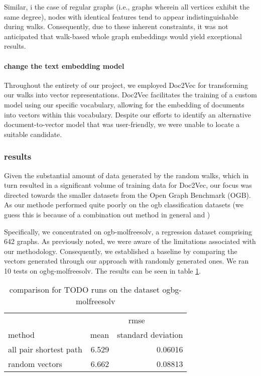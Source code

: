 Similar, i the case of regular graphs (i.e., graphs wherein all vertices exhibit the same degree), nodes with identical features tend to appear indistinguishable during walks. Consequently, due to these inherent constraints, it was not anticipated that walk-based whole graph embeddings would yield exceptional results.

\paragraph{change the text embedding model}
Throughout the entirety of our project, we employed Doc2Vec\cite{2014doc2vec} for transforming our walks into vector representations. Doc2Vec facilitates the training of a custom model using our specific vocabulary, allowing for the embedding of documents into vectors within this vocabulary. Despite our efforts to identify an alternative document-to-vector model that was user-friendly, we were unable to locate a suitable candidate.

\subsubsection{results}
Given the substantial amount of data generated by the random walks, which in turn resulted in a significant volume of training data for Doc2Vec, our focus was directed towards the smaller datasets from the Open Graph Benchmark (OGB). As our methode performed quite poorly on the ogb classification datasets (we guess this is because of a combination out method in general and )

Specifically, we concentrated on ogb-molfreesolv, a regression dataset comprising 642 graphs. As previously noted, we were aware of the limitations associated with our methodology. Consequently, we established a baseline by comparing the vectors generated through our approach with randomly generated ones. We ran 10 tests on ogbg-molfreesolv\cite{2021ogb}. The results can be seen in table \ref{table:ogbg-molfreesolv_results}.

\begin{table}[]
    \centering
    \begin{tabular}{@{}lrr@{}}
        \toprule
                               & \multicolumn{2}{c}{rmse}                      \\ \cmidrule(l){2-3}
        method                 & mean                     & standard deviation \\ \midrule
        all pair shortest path & 6.529                    & 0.06016            \\
        random vectors         & 6.662                    & 0.08813            \\ \bottomrule
    \end{tabular}
    \caption{comparison for TODO runs on the dataset ogbg-molfreesolv}
    \label{table:ogbg-molfreesolv_results}
\end{table}

